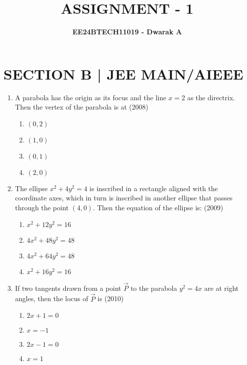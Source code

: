 \documentclass[journal,12pt,twocolumn]{IEEEtran}
\theoremstyle{remark}
\begin{document}

\vspace{3cm}

\title{\textbf{ASSIGNMENT - 1}}
\author{\textbf{EE24BTECH11019 - Dwarak A}}
\maketitle
\newpage
\bigskip

\renewcommand{\thefigure}{\theenumi}
\renewcommand{\thetable}{\theenumi}

\section*{\textbf{SECTION B | JEE MAIN/AIEEE}}
\bigskip

\begin{enumerate}
    \item A parabola has the origin as its focus and the line $x=2$ as the directrix. Then the vertex of the parabola is at
    \hfill(2008)

    \begin{enumerate}
    \item$(0,2)$
    \item$(1,0)$
    \item$(0,1)$
    \item$(2,0)$ 
    \end{enumerate}
    
    \item The ellipse $x^2+4y^2=4$ is inscribed in a rectangle aligned with the coordinate axes, which in turn is inscribed in another ellipse that passes through the point $(4,0)$. Then the equation of the ellipse is:
    \hfill(2009)

    \begin{enumerate}
    \item$x^2+12y^2=16$
    \item$4x^2+48y^2=48$
    \item$4x^2+64y^2=48$
    \item$x^2+16y^2=16$ 
    \end{enumerate}

    \item If two tangents drawn from a point $\vec{P}$ to the parabola $y^2=4x$ are at right angles, then the locus of $\vec{P}$ is
    \hfill(2010)
    
    \begin{enumerate}
    \item$2x+1=0$
    \item$x=-1$
    \item$2x-1=0$
    \item$x=1$ 
    \end{enumerate}


\end{enumerate}
\end{document}
